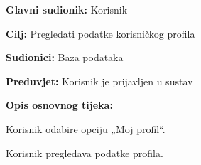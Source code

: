 			
				\noindent {}
				\begin{packed_item}
					
					\item \textbf{Glavni sudionik: }Korisnik
					\item  \textbf{Cilj:} Pregledati podatke korisničkog profila
					\item  \textbf{Sudionici:} Baza podataka
					\item  \textbf{Preduvjet:} Korisnik je prijavljen u sustav
					\item  \textbf{Opis osnovnog tijeka:}
					
					\item[] \begin{packed_enum}
						
						\item Korisnik odabire opciju „Moj profil“.
						\item Korisnik pregledava podatke profila.
					\end{packed_enum}
					
				\end{packed_item}
			
